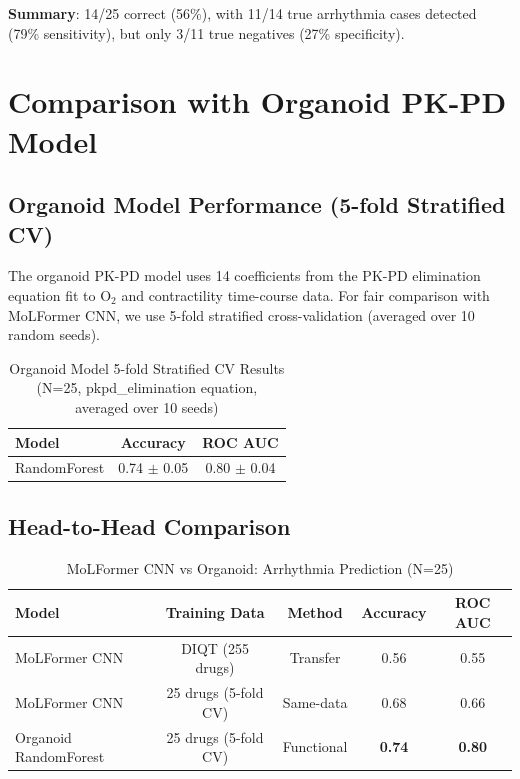 \documentclass[11pt]{article}
\begin{document}
\textbf{Summary}: 14/25 correct (56\%), with 11/14 true arrhythmia cases detected (79\% sensitivity), but only 3/11 true negatives (27\% specificity).


\section{Comparison with Organoid PK-PD Model}

\subsection{Organoid Model Performance (5-fold Stratified CV)}

The organoid PK-PD model uses 14 coefficients from the PK-PD elimination equation fit to O$_2$ and contractility time-course data. For fair comparison with MoLFormer CNN, we use 5-fold stratified cross-validation (averaged over 10 random seeds).

\begin{table}[H]
\centering
\caption{Organoid Model 5-fold Stratified CV Results (N=25, pkpd\_elimination equation, averaged over 10 seeds)}
\begin{tabular}{lcc}
\toprule
\textbf{Model} & \textbf{Accuracy} & \textbf{ROC AUC} \\
\midrule
RandomForest & 0.74 $\pm$ 0.05 & 0.80 $\pm$ 0.04 \\
\bottomrule
\end{tabular}
\end{table}

\subsection{Head-to-Head Comparison}

\begin{table}[H]
\centering
\caption{MoLFormer CNN vs Organoid: Arrhythmia Prediction (N=25)}
\begin{tabular}{lcccc}
\toprule
\textbf{Model} & \textbf{Training Data} & \textbf{Method} & \textbf{Accuracy} & \textbf{ROC AUC} \\
\midrule
MoLFormer CNN & DIQT (255 drugs) & Transfer & 0.56 & 0.55 \\
MoLFormer CNN & 25 drugs (5-fold CV) & Same-data & 0.68 & 0.66 \\
Organoid RandomForest & 25 drugs (5-fold CV) & Functional & \textbf{0.74} & \textbf{0.80} \\
\bottomrule
\end{tabular}
\end{table}
\end{document}
